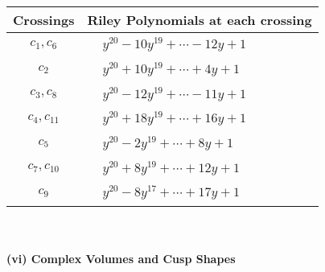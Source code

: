 \documentclass[1p]{elsarticle_modified}
\theoremstyle{definition}
\begin{document}
\begin{tabular}{m{50pt}|m{274pt}}
Crossings & \hspace{64pt}Riley Polynomials at each crossing \\
\hline $$\begin{aligned}c_{1},c_{6}\end{aligned}$$&$\begin{aligned}
&y^{20}-10 y^{19}+\cdots-12 y+1
\end{aligned}$\\
\hline $$\begin{aligned}c_{2}\end{aligned}$$&$\begin{aligned}
&y^{20}+10 y^{19}+\cdots+4 y+1
\end{aligned}$\\
\hline $$\begin{aligned}c_{3},c_{8}\end{aligned}$$&$\begin{aligned}
&y^{20}-12 y^{19}+\cdots-11 y+1
\end{aligned}$\\
\hline $$\begin{aligned}c_{4},c_{11}\end{aligned}$$&$\begin{aligned}
&y^{20}+18 y^{19}+\cdots+16 y+1
\end{aligned}$\\
\hline $$\begin{aligned}c_{5}\end{aligned}$$&$\begin{aligned}
&y^{20}-2 y^{19}+\cdots+8 y+1
\end{aligned}$\\
\hline $$\begin{aligned}c_{7},c_{10}\end{aligned}$$&$\begin{aligned}
&y^{20}+8 y^{19}+\cdots+12 y+1
\end{aligned}$\\
\hline $$\begin{aligned}c_{9}\end{aligned}$$&$\begin{aligned}
&y^{20}-8 y^{17}+\cdots+17 y+1
\end{aligned}$\\
\hline
\end{tabular}\\~\\
\newpage\flushleft \textbf{(vi) Complex Volumes and Cusp Shapes}
\end{document}
